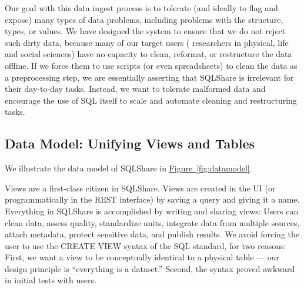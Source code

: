\documentclass{sig-alternate}
\newcommand{\note}[2]{{\color{#1} {#2}}}
\newcommand{\reviewmeta}[1]{\note{black}{#1}}
\newcommand{\reviewthree}[1]{\note{black}{#1}}
\newcommand{\figref}[1]{\hyperref[#1]{Figure~\ref*{#1}}}
\newcommand{\sqlshare}{SQLShare}
\begin{document}
\reviewthree{Our goal with this data ingest process is to tolerate (and ideally to flag and expose) many types of data problems, including problems with the structure, types, or values.  We have designed the system to ensure that we do not reject such dirty data, because many of our target users (\reviewmeta{researchers in physical, life and social sciences}) have no capacity to clean, reformat, or restructure the data offline. If we force them to use scripts (or even spreadsheets) to clean the data as a preprocessing step, we are essentially asserting that \sqlshare{} is irrelevant for their day-to-day tasks. Instead, we want to tolerate malformed data and encourage the use of SQL itself to scale and automate cleaning and restructuring tasks.}

\subsection{Data Model: Unifying Views and Tables}
\label{sec:datamodel}
We illustrate the data model of \sqlshare{} in \figref{fig:datamodel}. 

Views are a first-class citizen in \sqlshare{}.  Views are created in the UI (or programmatically in the REST interface) by saving a query and giving it a name.  Everything in \sqlshare{} is accomplished by writing and sharing views: Users can clean data, assess quality, standardize units, integrate data from multiple sources, attach metadata, protect sensitive data, and publish results.  We avoid forcing the user to use the CREATE VIEW syntax of the SQL standard, for two reasons: First, we want a view to be conceptually identical to a physical table --- our design principle is ``everything is a dataset.''  Second, the syntax proved awkward in initial tests with users.  
\end{document}
